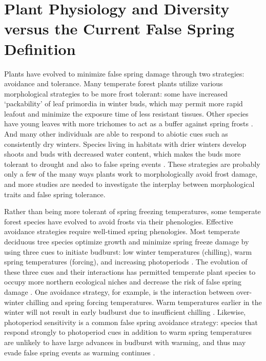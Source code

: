 \documentclass{article}\usepackage[]{graphicx}\usepackage[]{color}
\begin{document}
\section* {Plant Physiology and Diversity versus the Current False Spring Definition}
Plants have evolved to minimize false spring damage through two strategies: avoidance and tolerance. Many temperate forest plants utilize various morphological strategies to be more frost tolerant: some have increased `packability' of leaf primordia in winter buds, which may permit more rapid leafout \citep{Edwards2017} and minimize the exposure time of less resistant tissues. Other species have young leaves with more trichomes to act as a buffer against spring frosts \citep{Agrawal2004, Prozherina2003}. And many other individuals are able to respond to abiotic cues such as consistently dry winters. Species living in habitats with drier winters develop shoots and buds with decreased water content, which makes the buds more tolerant to drought and also to false spring events \citep{Beck2007, Kathke2011, Hofmann2015, Morin2007,  Muffler2016, Nielsen2009, Poirier2010}. These strategies are probably only a few of the many ways plants work to morphologically avoid frost damage, and more studies are needed to investigate the interplay between morphological traits and false spring tolerance. 

Rather than being more tolerant of spring freezing temperatures, some temperate forest species have evolved to avoid frosts via their phenologies. Effective avoidance strategies require well-timed spring phenologies. Most temperate deciduous tree species optimize growth and minimize spring freeze damage by using three cues to initiate budburst: low winter temperatures (chilling), warm spring temperatures (forcing), and increasing photoperiods \citep{Chuine2010}. The evolution of these three cues and their interactions has permitted temperate plant species to occupy more northern ecological niches \citep{Kollas2014} and decrease the risk of false spring damage %
\citep{Charrier2011}. One avoidance strategy, for example, is the interaction between over-winter chilling and spring forcing temperatures. Warm temperatures earlier in the winter %
will not result in early budburst due to insufficient chilling \citep{Basler2012}. Likewise, photoperiod sensitivity is a common false spring avoidance strategy: species that respond strongly to photoperiod cues in addition to warm spring temperatures are unlikely to have large advances in budburst with warming, and thus may evade false spring events as warming continues \citep{Basler2014}. 
\end{document}
